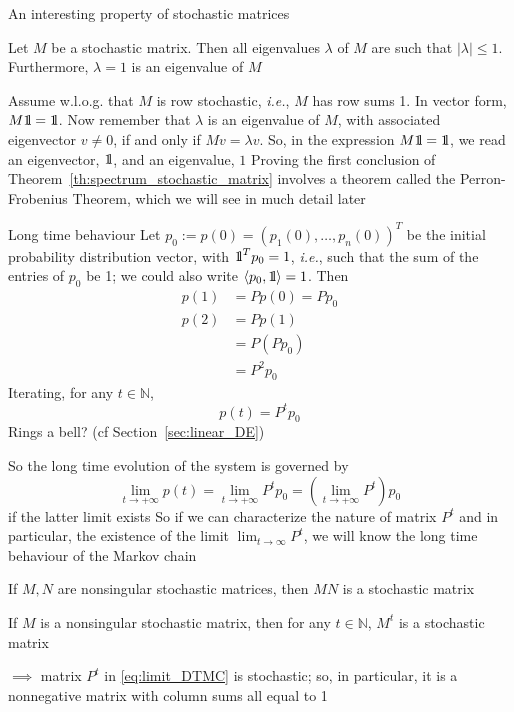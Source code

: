 \documentclass{beamer}
\def\IN{\mathbb{N}}
\def\ie{\emph{i.e.}}
\def\nbOne{{\mathchoice {\rm 1\mskip-4mu l} {\rm 1\mskip-4mu l}
		{\rm 1\mskip-4.5mu l} {\rm 1\mskip-5mu l}}}
\begin{document}
\begin{frame}{An interesting property of stochastic matrices}
\begin{theorem}\label{th:spectrum_stochastic_matrix}
	Let $M$ be a stochastic matrix. Then all eigenvalues $\lambda$ of $M$ are such that $|\lambda|\leq 1$. 
	Furthermore, $\lambda =1$ is an eigenvalue of $M$
\end{theorem}
Assume w.l.o.g. that $M$ is row stochastic, \ie, $M$ has row sums 1. In vector form, $M\nbOne=\nbOne$. Now remember that $\lambda$ is an eigenvalue of $M$, with associated eigenvector $v\neq 0$, if and only if $Mv=\lambda v$. So, in the expression $M\nbOne=\nbOne$, we read an eigenvector, $\nbOne$, and an eigenvalue, $1$
\vfill
Proving the first conclusion of Theorem~\ref{th:spectrum_stochastic_matrix} involves a theorem called the Perron-Frobenius Theorem, which we will see in much detail later
\end{frame}

\begin{frame}{Long time behaviour}
Let $p_0:=p(0)=(p_1(0),\ldots,p_n(0))^T$ be the initial probability distribution vector, with $\nbOne^Tp_0=1$, \ie, such that the sum of the entries of $p_0$ be 1; we could also write $\langle p_0,\nbOne\rangle = 1$. Then
\begin{align*}
p(1) &= Pp(0) = Pp_0 \\
p(2) &= Pp(1)\\
&= P(Pp_0) \\
&= P ^2p_0
\end{align*}
Iterating, for any $t\in\IN$,
\[
p(t)=P^tp_0
\]
\vfill
Rings a bell? (cf Section~\ref{sec:linear_DE})
\end{frame}

\begin{frame}
So the long time evolution of the system is governed by
\begin{equation}\label{eq:limit_DTMC}
\lim_{t\rightarrow +\infty}p(t)
=\lim_{t\rightarrow +\infty}P^tp_0
=\left(\lim_{t\rightarrow +\infty}P^t\right)p_0
\end{equation}
if the latter limit exists
\vfill
So if we can characterize the nature of matrix $P^t$ and in particular, the existence of the limit $\lim_{t\to\infty}P^t$, we will know the long time behaviour of the Markov chain
\end{frame}

\begin{frame}
\begin{theorem}
If $M,N$ are nonsingular stochastic matrices, then $MN$ is a stochastic matrix
\end{theorem}
\vfill
\begin{corollary}
If $M$ is a nonsingular stochastic matrix, then for any $t\in\IN$, $M^t$ is a stochastic matrix
\end{corollary}
\vfill
$\implies$ matrix $P^t$ in \eqref{eq:limit_DTMC} is stochastic; so, in particular, it is a nonnegative matrix with column sums all equal to 1
\end{frame}
\end{document}
